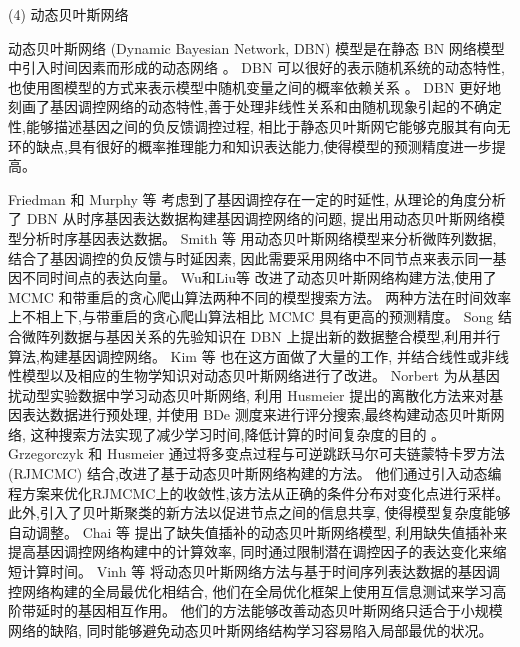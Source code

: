 (4) 动态贝叶斯网络

动态贝叶斯网络 (Dynamic Bayesian Network, DBN) 模型是在静态 BN 网络模型中引入时间因素而形成的动态网络 。
DBN 可以很好的表示随机系统的动态特性,也使用图模型的方式来表示模型中随机变量之间的概率依赖关系 。
DBN 更好地刻画了基因调控网络的动态特性,善于处理非线性关系和由随机现象引起的不确定性,能够描述基因之间的负反馈调控过程,
相比于静态贝叶斯网它能够克服其有向无环的缺点,具有很好的概率推理能力和知识表达能力,使得模型的预测精度进一步提高。

Friedman 和 Murphy 等  考虑到了基因调控存在一定的时延性,
从理论的角度分析了 DBN 从时序基因表达数据构建基因调控网络的问题, 提出用动态贝叶斯网络模型分析时序基因表达数据。
Smith 等  用动态贝叶斯网络模型来分析微阵列数据,
结合了基因调控的负反馈与时延因素, 因此需要采用网络中不同节点来表示同一基因不同时间点的表达向量。
Wu和Liu等  改进了动态贝叶斯网络构建方法,使用了 MCMC 和带重启的贪心爬山算法两种不同的模型搜索方法。 
两种方法在时间效率上不相上下,与带重启的贪心爬山算法相比 MCMC 具有更高的预测精度。
Song 结合微阵列数据与基因关系的先验知识在 DBN 上提出新的数据整合模型,利用并行算法,构建基因调控网络。
Kim 等  也在这方面做了大量的工作,
并结合线性或非线性模型以及相应的生物学知识对动态贝叶斯网络进行了改进。
Norbert  为从基因扰动型实验数据中学习动态贝叶斯网络,
利用 Husmeier  提出的离散化方法来对基因表达数据进行预处理,
并使用 BDe 测度来进行评分搜索,最终构建动态贝叶斯网络, 这种搜索方法实现了减少学习时间,降低计算的时间复杂度的目的 。
Grzegorczyk 和 Husmeier  通过将多变点过程与可逆跳跃马尔可夫链蒙特卡罗方法 (RJMCMC) 结合,改进了基于动态贝叶斯网络构建的方法。 他们通过引入动态编程方案来优化RJMCMC上的收敛性,该方法从正确的条件分布对变化点进行采样。 
此外,引入了贝叶斯聚类的新方法以促进节点之间的信息共享, 使得模型复杂度能够自动调整。
Chai 等  提出了缺失值插补的动态贝叶斯网络模型,
利用缺失值插补来提高基因调控网络构建中的计算效率,
同时通过限制潜在调控因子的表达变化来缩短计算时间。
Vinh 等  将动态贝叶斯网络方法与基于时间序列表达数据的基因调控网络构建的全局最优化相结合,
他们在全局优化框架上使用互信息测试来学习高阶带延时的基因相互作用。
他们的方法能够改善动态贝叶斯网络只适合于小规模网络的缺陷,
同时能够避免动态贝叶斯网络结构学习容易陷入局部最优的状况。

